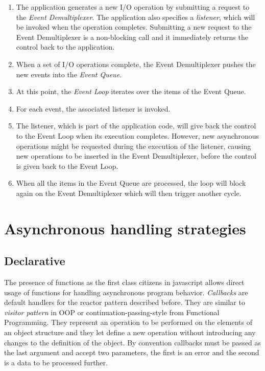 \begin{enumerate}
	\item The application generates a new I/O operation by submitting a request to the \textit{Event Demultiplexer}. The application also specifies a \textit{listener}, which will be invoked when the operation completes. Submitting a new request to the Event Demultiplexer is a non-blocking call and it immediately returns the control back to the application.
	\item When a set of I/O operations complete, the Event Demultiplexer pushes the new events into the \textit{Event Queue}.
	\item At this point, the \textit{Event Loop} iterates over the items of the Event Queue.
	\item For each event, the associated listener is invoked.
	\item The listener, which is part of the application code, will give back the control to the Event Loop when its execution completes. However, new asynchronous operations might be requested during the execution of the listener, causing new operations to be inserted in the Event Demultiplexer, before the control is given back to the Event Loop.
	\item When all the items in the Event Queue are processed, the loop will block again on the Event Demultiplexer which will then trigger another cycle.
\end{enumerate}

\section{Asynchronous handling strategies}
\label{sec:asyncstrat}
\subsection{Declarative}
The presence of functions as the first class citizens in javascript allows direct usage of functions for handling asynchronous program behavior. \textit{Callbacks} are default handlers for the reactor pattern described before. They are similar to \textit{visitor pattern} in OOP or continuation-passing-style from Functional Programming. They represent an operation to be performed on the elements of an object structure and they let define a new operation without introducing any changes to the definition of the object. 
By convention callbacks must be passed as the last argument and accept two parameters, the first is an error and the second is a data to be processed further.

